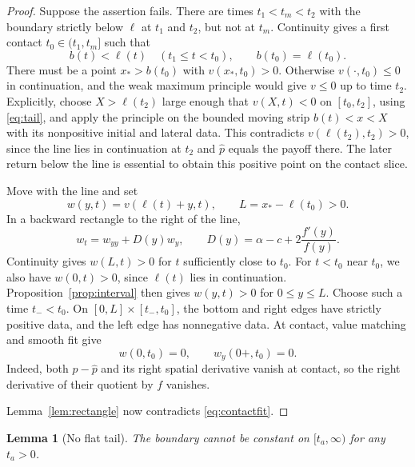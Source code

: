 \documentclass[11pt]{article}
\newtheorem{lemma}[theorem]{Lemma}
\newcommand{\phat}{\widehat p}
\begin{document}
\begin{proof}
Suppose the assertion fails. There are times $t_1<t_m<t_2$ with the
boundary strictly below $\ell$ at $t_1$ and $t_2$, but not at $t_m$.
Continuity gives a first contact $t_0\in(t_1,t_m]$ such that
\[
  b(t)<\ell(t)\quad(t_1\le t<t_0),\qquad b(t_0)=\ell(t_0).
\]
There must be a point $x_*>b(t_0)$ with $v(x_*,t_0)>0$.
Otherwise $v(\cdot,t_0)\le0$ in continuation, and the weak maximum
principle would give $v\le0$ up to time $t_2$. Explicitly, choose
$X>\ell(t_2)$ large enough that $v(X,t)<0$ on $[t_0,t_2]$, using
\eqref{eq:tail}, and apply the principle on the bounded moving
strip $b(t)<x<X$ with its nonpositive initial and lateral data.
This contradicts $v(\ell(t_2),t_2)>0$,
since the line lies in continuation at $t_2$ and $\phat$ equals
the payoff there. The later return below the line is essential to
obtain this positive point on the contact slice.

Move with the line and set
\[
  w(y,t)=v(\ell(t)+y,t),\qquad L=x_*-\ell(t_0)>0.
\]
In a backward rectangle to the right of the line,
\begin{equation}\label{eq:moving}
  w_t=w_{yy}+D(y)w_y,\qquad
  D(y)=\alpha-c+2\frac{f'(y)}{f(y)}.
\end{equation}
Continuity gives $w(L,t)>0$ for $t$ sufficiently close to $t_0$.
For $t<t_0$ near $t_0$, we also have $w(0,t)>0$, since
$\ell(t)$ lies in continuation. Proposition~\ref{prop:interval}
then gives $w(y,t)>0$ for $0\le y\le L$.
Choose such a time $t_-<t_0$. On
$[0,L]\times[t_-,t_0]$, the bottom and right edges have strictly
positive data, and the left edge has nonnegative data. At contact,
value matching and smooth fit give
\begin{equation}\label{eq:contactfit}
  w(0,t_0)=0,\qquad w_y(0+,t_0)=0.
\end{equation}
Indeed, both $p-\phat$ and its right spatial derivative vanish at
contact, so the right derivative of their quotient by $f$ vanishes.

Lemma~\ref{lem:rectangle} now contradicts \eqref{eq:contactfit}.
\end{proof}

\begin{lemma}[No flat tail]\label{lem:noflattail}
The boundary cannot be constant on $[t_a,\infty)$ for any $t_a>0$.
\end{lemma}
\end{document}
